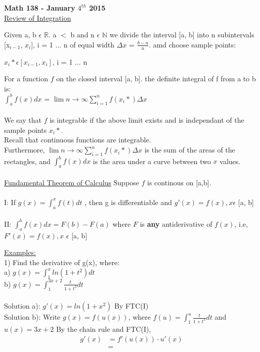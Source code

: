 \documentclass[12pt]{letter}
\begin{document}
\begin{center}{{\LARGE \textbf{Math 138 - January $4^{th}$ 2015}} \\  \underline{Review of Integration}}\end{center}

Given a, b {\Large $\epsilon$} $\mathbb{R}$. a $<$ b and n {\Large $\epsilon$} $\mathbb{N}$ we divide the interval [a, b] into n subintervals [x$_{i-1}$, $x_{i}$],
i = 1 ... n of equal width $\Delta x$ = $\frac{b - a}{n}$. amd choose sample points:  \\ 
\begin{center}$x_{i} * \epsilon [x_{i-1}, x_{i}]$, i = 1 ... n\end{center} 
For a function $f$ on the closed interval [a, b]. the definite integral of  f from a to b is: \\
{\large{$\int_{a}^{b} f(x) dx$ = $\lim{n\to\infty} \sum_{i=1}^n f(x_{i} *) \Delta x$}} \\  \\
We say that $f$ is integrable if the above limit exists and is independant of the sample points $x_{i} *$. \\
Recall that continuous functions are integrable. \\
 Furthermore, $\lim{n\to\infty} \sum_{i=1}^n f(x_{i} *) \Delta x$ is the sum of the areas of the rectangles, and $\int_{a}^{b} f(x) dx$ is the area under a curve between two $x$ values. \\ \\
\underline {Fundamental Theorem of Calculus}
Suppose $f$ is continous on [a,b]. \\ \\
I: If $g(x) =  \int_{a}^{x} f(t) dt$ , then g is differentiable and $g'(x) = f(x), x${\Large $\epsilon$} [a, b] \\ \\
II: $\int_{a}^{b} f(x)dx = F(b) - F(a)$ where $F$ is \textbf{any} antiderivative of $f(x)$, i.e, $F'(x) = f(x), x$ {\large {$\epsilon$}} [a, b]

\underline{Examples:} \\ 
1) Find the derivative of g(x), where: \\ a) $g(x) = \int_{1}^{x} ln(1+t^{2})dt$ \\ b)  $g(x) = \int_{1}^{3x+2}\frac{t}{1+t^{3}}dt$ \\ \\
Solution a): $g'(x) = ln(1+x^{2})$ By FTC(I) \\
Solution b): Write $g(x) = f(u(x))$, where $f(u) = \int_{1}^{u}\frac{t}{1+t^{3}}dt$ and $u(x) = 3x + 2$
By the chain rule and FTC(I), \\ \begin{equation} \begin{split} g'(x) &= f'(u(x)) \cdot u'(x) \\ &= \end{split} \end{equation}
\end{document}

